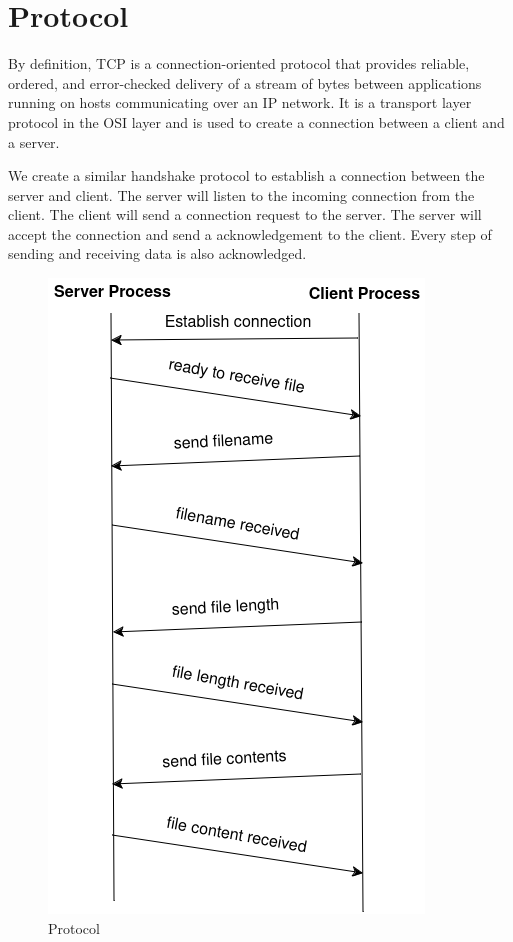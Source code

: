 \documentclass[11pt]{article}
\begin{document}
\section{Protocol}
By definition, TCP is a connection-oriented protocol that provides reliable, ordered, 
and error-checked delivery of a stream of bytes between applications running on hosts 
communicating over an IP network. It is a transport layer protocol in the OSI layer 
and is used to create a connection between a client and a server.

We create a similar handshake protocol to establish a connection between the server and 
client. The server will listen to the incoming connection from the client. The client will 
send a connection request to the server. The server will accept the connection and send a 
acknowledgement to the client. Every step of sending and receiving data is also acknowledged.

\begin{figure}[H]
  \includegraphics[scale=0.5]{file-transfer.png}
  \centering
  \caption{Protocol}
\end{figure}


\end{document}
